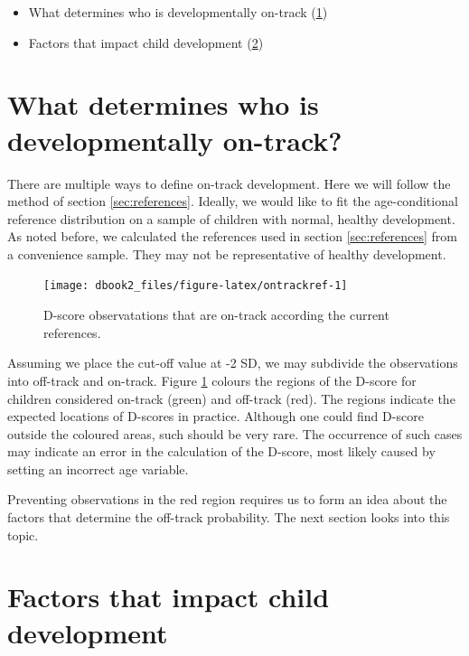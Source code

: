 \documentclass[
]{book}
\providecommand{\tightlist}{%
  \setlength{\itemsep}{0pt}\setlength{\parskip}{0pt}}
\begin{document}
\begin{itemize}
\tightlist
\item
  What determines who is developmentally on-track (\ref{sec:application2})
\item
  Factors that impact child development (\ref{sec:factors})
\end{itemize}

\hypertarget{sec:application2}{%
\section{What determines who is developmentally on-track?}\label{sec:application2}}

There are multiple ways to define on-track development. Here we will follow the method of section \ref{sec:references}. Ideally, we would like to fit the age-conditional reference distribution on a sample of children with normal, healthy development. As noted before, we calculated the references used in section \ref{sec:references} from a convenience sample. They may not be representative of healthy development.

\begin{figure}

{\centering \texttt{[image: dbook2\_files/figure-latex/ontrackref-1]} 

}

\caption{D-score observatations that are on-track according the current references.}\label{fig:ontrackref}
\end{figure}



Assuming we place the cut-off value at -2 SD, we may subdivide the observations into off-track and on-track. Figure \ref{fig:ontrackref} colours the regions of the D-score for children considered on-track (green) and off-track (red). The regions indicate the expected locations of D-scores in practice. Although one could find D-score outside the coloured areas, such should be very rare. The occurrence of such cases may indicate an error in the calculation of the D-score, most likely caused by setting an incorrect age variable.

Preventing observations in the red region requires us to form an idea about the factors that determine the off-track probability. The next section looks into this topic.

\hypertarget{sec:factors}{%
\section{Factors that impact child development}\label{sec:factors}}
\end{document}
